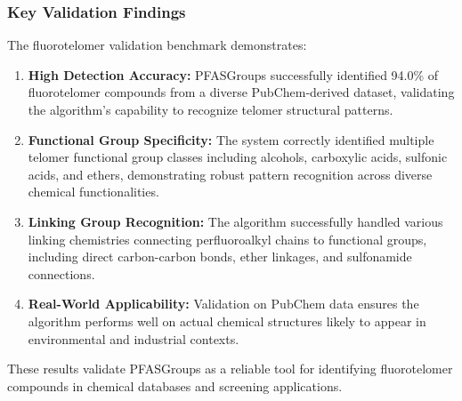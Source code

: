 \subsubsection*{Key Validation Findings}

The fluorotelomer validation benchmark demonstrates:

\begin{enumerate}
\item \textbf{High Detection Accuracy:} PFASGroups successfully identified 94.0\% of fluorotelomer compounds from a diverse PubChem-derived dataset, validating the algorithm's capability to recognize telomer structural patterns.

\item \textbf{Functional Group Specificity:} The system correctly identified multiple telomer functional group classes including alcohols, carboxylic acids, sulfonic acids, and ethers, demonstrating robust pattern recognition across diverse chemical functionalities.

\item \textbf{Linking Group Recognition:} The algorithm successfully handled various linking chemistries connecting perfluoroalkyl chains to functional groups, including direct carbon-carbon bonds, ether linkages, and sulfonamide connections.

\item \textbf{Real-World Applicability:} Validation on PubChem data ensures the algorithm performs well on actual chemical structures likely to appear in environmental and industrial contexts.
\end{enumerate}

These results validate PFASGroups as a reliable tool for identifying fluorotelomer compounds in chemical databases and screening applications.

